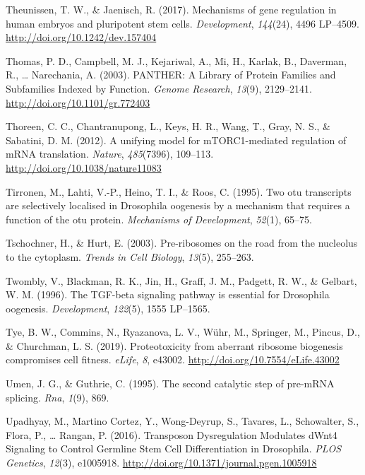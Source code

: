 \documentclass[12pt,twoside]{reedthesis}
\newlength{\cslhangindent}
\newenvironment{cslreferences}%
  {\setlength{\parindent}{0pt}%
  \everypar{\setlength{\hangindent}{\cslhangindent}}\ignorespaces}%
  {\par}
\begin{document}
\begin{cslreferences}
\leavevmode\hypertarget{ref-Theunissen2017b}{}%
Theunissen, T. W., \& Jaenisch, R. (2017). Mechanisms of gene regulation in human embryos and pluripotent stem cells. \emph{Development}, \emph{144}(24), 4496 LP--4509. \url{http://doi.org/10.1242/dev.157404}

\leavevmode\hypertarget{ref-thomasPANTHERLibraryProtein2003}{}%
Thomas, P. D., Campbell, M. J., Kejariwal, A., Mi, H., Karlak, B., Daverman, R., \ldots{} Narechania, A. (2003). PANTHER: A Library of Protein Families and Subfamilies Indexed by Function. \emph{Genome Research}, \emph{13}(9), 2129--2141. \url{http://doi.org/10.1101/gr.772403}

\leavevmode\hypertarget{ref-thoreenUnifyingModelMTORC1mediated2012}{}%
Thoreen, C. C., Chantranupong, L., Keys, H. R., Wang, T., Gray, N. S., \& Sabatini, D. M. (2012). A unifying model for mTORC1-mediated regulation of mRNA translation. \emph{Nature}, \emph{485}(7396), 109--113. \url{http://doi.org/10.1038/nature11083}

\leavevmode\hypertarget{ref-Tirronen1995}{}%
Tirronen, M., Lahti, V.-P., Heino, T. I., \& Roos, C. (1995). Two otu transcripts are selectively localised in Drosophila oogenesis by a mechanism that requires a function of the otu protein. \emph{Mechanisms of Development}, \emph{52}(1), 65--75.

\leavevmode\hypertarget{ref-Tschochner2003a}{}%
Tschochner, H., \& Hurt, E. (2003). Pre-ribosomes on the road from the nucleolus to the cytoplasm. \emph{Trends in Cell Biology}, \emph{13}(5), 255--263.

\leavevmode\hypertarget{ref-Twombly1996d}{}%
Twombly, V., Blackman, R. K., Jin, H., Graff, J. M., Padgett, R. W., \& Gelbart, W. M. (1996). The TGF-beta signaling pathway is essential for Drosophila oogenesis. \emph{Development}, \emph{122}(5), 1555 LP--1565.

\leavevmode\hypertarget{ref-tyeProteotoxicityAberrantRibosome2019}{}%
Tye, B. W., Commins, N., Ryazanova, L. V., Wühr, M., Springer, M., Pincus, D., \& Churchman, L. S. (2019). Proteotoxicity from aberrant ribosome biogenesis compromises cell fitness. \emph{eLife}, \emph{8}, e43002. \url{http://doi.org/10.7554/eLife.43002}

\leavevmode\hypertarget{ref-Umen1995}{}%
Umen, J. G., \& Guthrie, C. (1995). The second catalytic step of pre-mRNA splicing. \emph{Rna}, \emph{1}(9), 869.

\leavevmode\hypertarget{ref-upadhyayTransposonDysregulationModulates2016}{}%
Upadhyay, M., Martino Cortez, Y., Wong-Deyrup, S., Tavares, L., Schowalter, S., Flora, P., \ldots{} Rangan, P. (2016). Transposon Dysregulation Modulates dWnt4 Signaling to Control Germline Stem Cell Differentiation in Drosophila. \emph{PLOS Genetics}, \emph{12}(3), e1005918. \url{http://doi.org/10.1371/journal.pgen.1005918}


\end{cslreferences}
\end{document}
